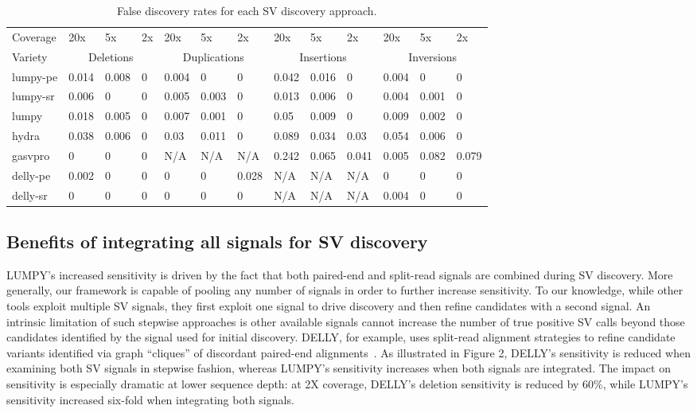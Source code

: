\documentclass[10pt]{bmc_article}
\newenvironment{bmcformat}{\begin{raggedright}\baselineskip20pt\sloppy\setboolean{publ}{false}}{\end{raggedright}\baselineskip20pt\sloppy}
\begin{document}
\begin{bmcformat}
\begin{table}[h!b!p!]
\small
\caption{False discovery rates for each SV discovery approach.}
\begin{tabular}{l|lll|lll|lll|lll}
		Coverage
		&20x&5x&2x &20x&5x&2x &20x&5x&2x &20x&5x&2x \\
\cline{1-13}
			Variety
			&\multicolumn{3}{c}{Deletions}
			&\multicolumn{3}{|c}{Duplications}
			&\multicolumn{3}{|c}{Insertions}
			&\multicolumn{3}{|c}{Inversions} \\
\cline{1-13}
lumpy-pe		&0.014&0.008&0&0.004&0	  &0    &0.042&0.016&0	  &0.004&0	  &0 \\
lumpy-sr      &0.006&0	&0&0.005&0.003&0	&0.013&0.006&0	  &0.004&0.001&0 \\
lumpy    &0.018&0.005&0&0.007&0.001&0	&0.05 &0.009&0	  &0.009&0.002&0 \\
hydra   &0.038&0.006&0&0.03 &0.011&0	&0.089&0.034&0.03 &0.054&0.006&0 \\
gasvpro	&0	  &0	&0&N/A  &N/A  &N/A  &0.242&0.065&0.041&0.005&0.082&0.079 \\
delly-pe	&0.002&0	&0&0	&0	  &0.028&N/A  &N/A	&N/A  &0	&0	  &0 \\
delly-sr	&0	  &0	&0&0	&0	  &0	&N/A  &N/A	&N/A  &0.004&0	  &0 \\

\end{tabular}
\label{table:fdr}
\end{table}


\subsection*{Benefits of integrating all signals for SV discovery}

LUMPY's increased sensitivity is driven by the fact that both paired-end and
split-read signals are combined during SV discovery. More generally, our
framework is capable of pooling any number of signals in order to further
increase sensitivity. To our knowledge, while other tools exploit multiple SV
signals, they first exploit one signal to drive discovery and then refine
candidates with a second signal. An intrinsic limitation of such stepwise
approaches is other available signals cannot increase the number of true
positive SV calls beyond those candidates identified by the signal used for
initial discovery. DELLY, for example, uses split-read alignment strategies to
refine candidate variants identified via graph ``cliques'' of discordant
paired-end alignments~\cite{rausch2012b}. As illustrated in Figure 2, DELLY's
sensitivity is reduced when examining both SV signals in stepwise fashion,
whereas LUMPY's sensitivity increases when both signals are integrated. The
impact on sensitivity is especially dramatic at lower sequence depth: at 2X
coverage, DELLY's deletion sensitivity is reduced by 60\%, while LUMPY's
sensitivity increased six-fold when integrating both signals.


\end{bmcformat}
\end{document}
